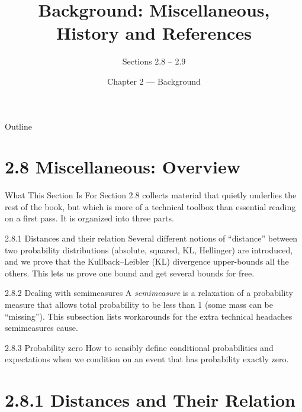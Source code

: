 \documentclass[aspectratio=169,10pt]{beamer}
\title{Background: Miscellaneous, History and References}
\subtitle{Sections 2.8 -- 2.9}
\author{Chapter 2 --- Background}
\institute{An Introduction to Universal Artificial Intelligence \\ \small Hutter, Quarel, Catt (2024)}
\date{}
\begin{document}
\begin{frame}
  \titlepage
\end{frame}

\begin{frame}{Outline}
  \tableofcontents
\end{frame}

\section{2.8 Miscellaneous: Overview}

\begin{frame}{What This Section Is For}
  Section 2.8 collects material that quietly underlies the rest of the book,
  but which is more of a technical toolbox than essential reading on a first
  pass. It is organized into three parts.

  \begin{block}{2.8.1 Distances and their relation}
    Several different notions of ``distance'' between two probability
    distributions (absolute, squared, KL, Hellinger) are introduced, and we
    prove that the Kullback--Leibler (KL) divergence upper-bounds all the
    others. This lets us prove one bound and get several bounds for free.
  \end{block}

  \begin{block}{2.8.2 Dealing with semimeasures}
    A \emph{semimeasure} is a relaxation of a probability measure that allows
    total probability to be less than 1 (some mass can be ``missing''). This
    subsection lists workarounds for the extra technical headaches
    semimeasures cause.
  \end{block}

  \begin{block}{2.8.3 Probability zero}
    How to sensibly define conditional probabilities and expectations when we
    condition on an event that has probability exactly zero.
  \end{block}
\end{frame}

\section{2.8.1 Distances and Their Relation}
\end{document}
